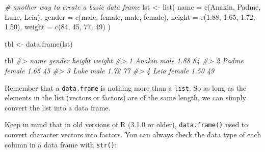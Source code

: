\documentclass[
]{book}
\newenvironment{Shaded}{\begin{snugshade}}{\end{snugshade}}
\newcommand{\AttributeTok}[1]{\textcolor[rgb]{0.77,0.63,0.00}{#1}}
\newcommand{\CommentTok}[1]{\textcolor[rgb]{0.56,0.35,0.01}{\textit{#1}}}
\newcommand{\DecValTok}[1]{\textcolor[rgb]{0.00,0.00,0.81}{#1}}
\newcommand{\FloatTok}[1]{\textcolor[rgb]{0.00,0.00,0.81}{#1}}
\newcommand{\FunctionTok}[1]{\textcolor[rgb]{0.00,0.00,0.00}{#1}}
\newcommand{\NormalTok}[1]{#1}
\newcommand{\OtherTok}[1]{\textcolor[rgb]{0.56,0.35,0.01}{#1}}
\newcommand{\StringTok}[1]{\textcolor[rgb]{0.31,0.60,0.02}{#1}}
\begin{document}
\begin{Shaded}
\begin{Highlighting}[]
\CommentTok{\# another way to create a basic data frame}
\NormalTok{lst }\OtherTok{\textless{}{-}} \FunctionTok{list}\NormalTok{(}
  \AttributeTok{name =} \FunctionTok{c}\NormalTok{(}\StringTok{\textquotesingle{}Anakin\textquotesingle{}}\NormalTok{, }\StringTok{\textquotesingle{}Padme\textquotesingle{}}\NormalTok{, }\StringTok{\textquotesingle{}Luke\textquotesingle{}}\NormalTok{, }\StringTok{\textquotesingle{}Leia\textquotesingle{}}\NormalTok{),}
  \AttributeTok{gender =} \FunctionTok{c}\NormalTok{(}\StringTok{\textquotesingle{}male\textquotesingle{}}\NormalTok{, }\StringTok{\textquotesingle{}female\textquotesingle{}}\NormalTok{, }\StringTok{\textquotesingle{}male\textquotesingle{}}\NormalTok{, }\StringTok{\textquotesingle{}female\textquotesingle{}}\NormalTok{),}
  \AttributeTok{height =} \FunctionTok{c}\NormalTok{(}\FloatTok{1.88}\NormalTok{, }\FloatTok{1.65}\NormalTok{, }\FloatTok{1.72}\NormalTok{, }\FloatTok{1.50}\NormalTok{),}
  \AttributeTok{weight =} \FunctionTok{c}\NormalTok{(}\DecValTok{84}\NormalTok{, }\DecValTok{45}\NormalTok{, }\DecValTok{77}\NormalTok{, }\DecValTok{49}\NormalTok{)}
\NormalTok{)}

\NormalTok{tbl }\OtherTok{\textless{}{-}} \FunctionTok{data.frame}\NormalTok{(lst)}

\NormalTok{tbl}
\CommentTok{\#\textgreater{}     name gender height weight}
\CommentTok{\#\textgreater{} 1 Anakin   male   1.88     84}
\CommentTok{\#\textgreater{} 2  Padme female   1.65     45}
\CommentTok{\#\textgreater{} 3   Luke   male   1.72     77}
\CommentTok{\#\textgreater{} 4   Leia female   1.50     49}
\end{Highlighting}
\end{Shaded}

Remember that a \texttt{data.frame} is nothing more than a \texttt{list}. So as long as the
elements in the list (vectors or factors) are of the same length, we can simply
convert the list into a data frame.

Keep in mind that in old versions of R (3.1.0 or older), \texttt{data.frame()} used to
convert character vectors into factors. You can always check the data type of
each column in a data frame with \texttt{str()}:

\begin{Shaded}
\end{Shaded}
\end{document}
